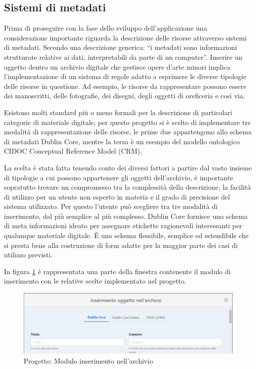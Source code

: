 \subsection{Sistemi di metadati}

Prima di proseguire con la fase dello sviluppo dell'applicazione una considerazione importante riguarda la descrizione delle risorse attraverso sistemi di metadati. Secondo una descrizione generica: “i metadati sono informazioni strutturate relative ai dati, interpretabili da parte di un computer”. Inserire un oggetto dentro un archivio digitale che gestisce opere d’arte minori implica l'implementazione di un sistema di regole adatto a esprimere le diverse tipologie delle risorse in questione. Ad esempio, le risorse da rappresentare possono essere dei manoscritti, delle fotografie, dei disegni, degli oggetti di oreficeria e così via.

Esistono molti standard più o meno formali per la descrizione di particolari categorie di materiale digitale, per questo progetto si è scelto di implementare tre modalità di rappresentazione delle risorse, le prime due appartengono allo schema di metadati Dublin Core, mentre la terza è un esempio del modello ontologico CIDOC Conceptual Reference Model (CRM).

La scelta è stata fatta tenendo conto dei diversi fattori a partire dal vasto insieme di tipologie a cui possono appartenere gli oggetti dell'archivio, è importante sopratutto trovare un compromesso tra la complessità della descrizione, la facilità di utilizzo per un utente non esperto in materia e il grado di precisione del sistema utilizzato. Per questo l’utente può scegliere tra tre modalità di inserimento, dal più semplice al più complesso. Dublin Core fornisce uno schema di meta informazioni ideato per assegnare etichette ragionevoli interessanti per qualunque materiale digitale. È uno schema flessibile, semplice ed estendibile che si presta bene alla costruzione di form adatte per la maggior parte dei casi di utilizzo previsti.

In figura \ref{fig:progettoInserimento} è rappresentata una parte della finestra contenente il modulo di inserimento con le relative scelte implementato nel progetto.

\begin{figure}[H]
\centering
\includegraphics[width=1\textwidth]{immagini/inserimentoArchivio.PNG}
\caption{Progetto: Modulo inserimento nell'archivio}
\label{fig:progettoInserimento}
\end{figure}

